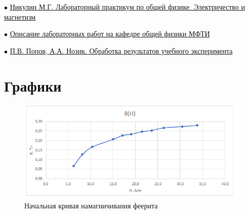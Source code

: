 $\bullet$ \href{https://vk.com/doc-139677307_612194888}{Никулин М.Г. Лабораторный практикум по общей физике. Электричество и магнетизм}

$\bullet$ \href{https://mipt.ru/education/chair/physics/S_III/lab_el.php}{Описание лабораторных работ на кафедре общей физики МФТИ}

$\bullet$ \href{https://vk.com/doc-139677307_612194961}{П.В. Попов, А.А. Нозик. Обработка результатов учебного эксперимента}


\newpage
\section{{Графики}}

\begin{figure}[H]
    \centering
    \includegraphics[scale=0.7]{феррит1.png}
    \caption{Начальная кривая намагничивания феерита}
    \label{fig:scheme}
\end{figure}

